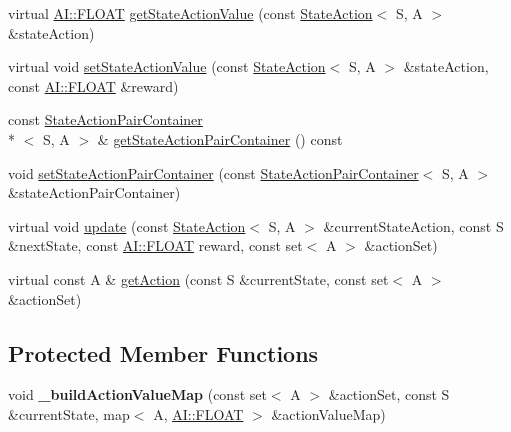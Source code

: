 \begin{DoxyCompactItemize}
\item 
virtual \hyperlink{namespaceAI_a41b74884a20833db653dded3918e05c3}{A\+I\+::\+F\+L\+O\+A\+T} \hyperlink{classAI_1_1Algorithm_1_1ReinforcementLearning_ad078677d92b33df4ae7d3c78e040b766}{get\+State\+Action\+Value} (const \hyperlink{classAI_1_1StateAction}{State\+Action}$<$ S, A $>$ \&state\+Action)
\item 
virtual void \hyperlink{classAI_1_1Algorithm_1_1ReinforcementLearning_a5d576410235e5099f153d21f20a8e5af}{set\+State\+Action\+Value} (const \hyperlink{classAI_1_1StateAction}{State\+Action}$<$ S, A $>$ \&state\+Action, const \hyperlink{namespaceAI_a41b74884a20833db653dded3918e05c3}{A\+I\+::\+F\+L\+O\+A\+T} \&reward)
\item 
const \hyperlink{classAI_1_1StateActionPairContainer}{State\+Action\+Pair\+Container}\\*
$<$ S, A $>$ \& \hyperlink{classAI_1_1Algorithm_1_1ReinforcementLearning_a6b5fe1be9629bf5574d32ae4eeec33f5}{get\+State\+Action\+Pair\+Container} () const 
\item 
void \hyperlink{classAI_1_1Algorithm_1_1ReinforcementLearning_ad889f5f5949cac39d121f57e3027ad0c}{set\+State\+Action\+Pair\+Container} (const \hyperlink{classAI_1_1StateActionPairContainer}{State\+Action\+Pair\+Container}$<$ S, A $>$ \&state\+Action\+Pair\+Container)
\item 
virtual void \hyperlink{classAI_1_1Algorithm_1_1ReinforcementLearning_a25d7fa245a79e61061436dc0f1db90cb}{update} (const \hyperlink{classAI_1_1StateAction}{State\+Action}$<$ S, A $>$ \&current\+State\+Action, const S \&next\+State, const \hyperlink{namespaceAI_a41b74884a20833db653dded3918e05c3}{A\+I\+::\+F\+L\+O\+A\+T} reward, const set$<$ A $>$ \&action\+Set)
\item 
virtual const A \& \hyperlink{classAI_1_1Algorithm_1_1ReinforcementLearning_acb89c1734df6658a422af510b7c36377}{get\+Action} (const S \&current\+State, const set$<$ A $>$ \&action\+Set)
\end{DoxyCompactItemize}
\subsection*{Protected Member Functions}
\begin{DoxyCompactItemize}
\item 
\hypertarget{classAI_1_1Algorithm_1_1ReinforcementLearning_a3efc892a8b36ee3f878c86d15f30883f}{void {\bfseries \+\_\+build\+Action\+Value\+Map} (const set$<$ A $>$ \&action\+Set, const S \&current\+State, map$<$ A, \hyperlink{namespaceAI_a41b74884a20833db653dded3918e05c3}{A\+I\+::\+F\+L\+O\+A\+T} $>$ \&action\+Value\+Map)}\label{classAI_1_1Algorithm_1_1ReinforcementLearning_a3efc892a8b36ee3f878c86d15f30883f}

\end{DoxyCompactItemize}
